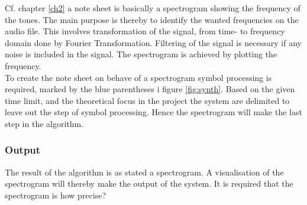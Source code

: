  
Cf. chapter \ref{ch2} a note sheet is basically a spectrogram showing the frequency of the tones. The main purpose is thereby to identify the wanted frequencies on the audio file. This involves transformation of the signal, from time- to frequency domain done by Fourier Transformation. Filtering of the signal is necessary if any noise is included in the signal. The spectrogram is achieved by plotting the frequency. \\
To create the note sheet on behave of a spectrogram symbol processing is required, marked by the blue parentheses i figure \ref{fig:synth}. Based on the given time limit, and the theoretical focus in the project the system are delimited to leave out the step of symbol processing. Hence the spectrogram will make the last step in the algorithm. 

\subsubsection{Output} 
The result of the algorithm is as stated a spectrogram. A visualisation of the spectrogram will thereby make the output of the system. It is required that the spectrogram is how precise?       

